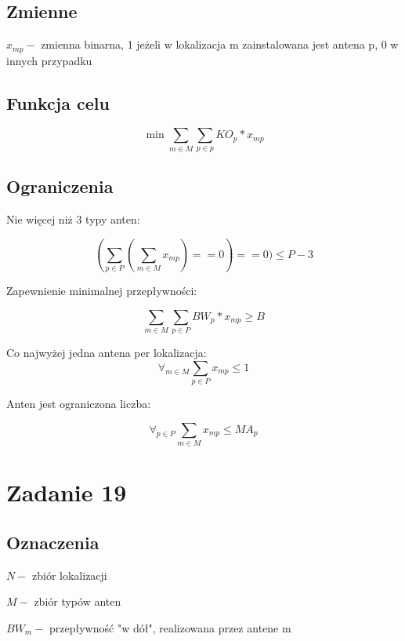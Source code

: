 \documentclass{article}
\begin{document}
\subsection{Zmienne}
$x_{mp} - $ zmienna binarna, 1 jeżeli w lokalizacja m zainstalowana jest antena p, 0 w innych przypadku

\subsection{Funkcja celu}

\begin{equation}
  \min \sum_{m \in M} \sum_{p \in p} KO_p * x_{mp}
\end{equation}

\subsection{Ograniczenia}
Nie więcej niż 3 typy anten:

\begin{equation}
   (\sum_{p \in P}(\sum_{m \in M} x_{mp}) == 0) == 0) \leq P-3
\end{equation}

Zapewnienie minimalnej przepływności:

\begin{equation}
  \sum_{m \in M} \sum_{p \in P} BW_p * x_{mp} \geq B
\end{equation}

Co najwyżej jedna antena per lokalizacja:
\begin{equation}
  \forall_{m \in M} \sum_{p \in P} x_{mp} \leq 1
\end{equation}

Anten jest ograniczona liczba:

\begin{equation}
  \forall_{p \in P} \sum_{m \in M} x_{mp} \leq {MA}_p
\end{equation}


\section{Zadanie 19}

\subsection{Oznaczenia}
$N -$ zbiór lokalizacji

$M -$ zbiór typów anten

$BW_m -$ przepływność "w dół", realizowana przez antene m
\end{document}

